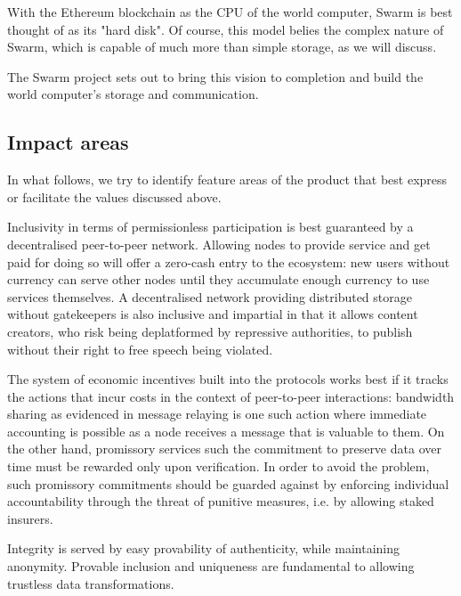  
With the Ethereum blockchain as the CPU of the world computer, Swarm is best thought of as its "hard disk". Of course, this model belies the complex nature of Swarm, which is capable of much more than simple storage, as we will discuss.

The Swarm project sets out to bring this vision to completion and build the world computer's storage and communication. 

\subsection{Impact areas \statusorange}

In what follows, we try to identify feature areas of the product that best express or facilitate the values discussed above. 

Inclusivity in terms of permissionless participation is best guaranteed by a decentralised peer-to-peer network.  
Allowing nodes to provide service and get paid for doing so will offer a zero-cash entry to the ecosystem: new users without currency can serve other nodes until they accumulate enough currency to use services themselves. A decentralised network providing distributed storage without gatekeepers is also inclusive and impartial in that it allows content creators, who risk being deplatformed by repressive  authorities, to publish without their right to free speech being violated. 

The system of economic incentives built into the protocols works best if it tracks the actions that incur costs in the context of peer-to-peer interactions: bandwidth sharing as evidenced in message relaying is one such action where immediate accounting is possible as a node receives a message that is valuable to them. On the other hand, promissory services such the commitment to preserve data over time must be rewarded only upon verification. In order to avoid the  problem, such promissory commitments should be guarded against by enforcing individual accountability through the threat of punitive measures, i.e. by allowing staked insurers.

Integrity is served by easy provability of authenticity, while maintaining anonymity.
Provable inclusion and uniqueness are fundamental to allowing trustless data transformations.



